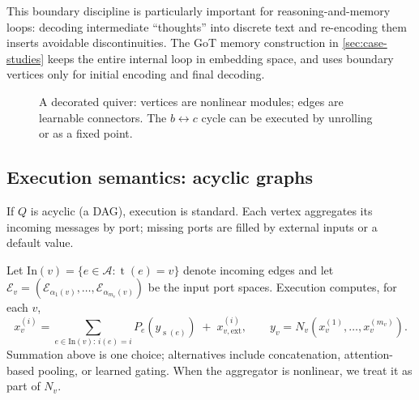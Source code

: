\documentclass[11pt]{article}
\theoremstyle{definition}
\theoremstyle{plain}
\theoremstyle{remark}
\newcommand{\mc}[1]{\mathcal{#1}}
\newcommand{\Emb}{\mc{E}}
\newcommand{\Edges}{\mc{A}}
\newcommand{\src}{\operatorname{s}}
\newcommand{\tgt}{\operatorname{t}}
\begin{document}
This boundary discipline is particularly important for reasoning-and-memory loops: decoding intermediate ``thoughts'' into discrete text and re-encoding them inserts avoidable discontinuities.
The GoT memory construction in \cref{sec:case-studies} keeps the entire internal loop in embedding space, and uses boundary vertices only for initial encoding and final decoding.


\begin{figure}[t]
\centering
{}
\caption{A decorated quiver: vertices are nonlinear modules; edges are learnable connectors.
The $b\leftrightarrow c$ cycle can be executed by unrolling or as a fixed point.}
\label{fig:quiver}
\end{figure}

\subsection{Execution semantics: acyclic graphs}
\label{sec:acyclic}

If $Q$ is acyclic (a DAG), execution is standard.
Each vertex aggregates its incoming messages by port; missing ports are filled by external inputs or a default value.

Let $\mathrm{In}(v)=\{e\in\Edges:\tgt(e)=v\}$ denote incoming edges and let $\mc{E}_v=(\Emb_{\alpha_1(v)},\dots,\Emb_{\alpha_{m_v}(v)})$ be the input port spaces.
Execution computes, for each $v$,
\[
x_v^{(i)} = \sum_{e\in\mathrm{In}(v):\, i(e)=i} P_e(y_{\src(e)}) \;+\; x_{v,\mathrm{ext}}^{(i)},
\qquad
y_v = N_v(x_v^{(1)},\dots,x_v^{(m_v)}).
\]
Summation above is one choice; alternatives include concatenation, attention-based pooling, or learned gating.
When the aggregator is nonlinear, we treat it as part of $N_v$.
\end{document}
